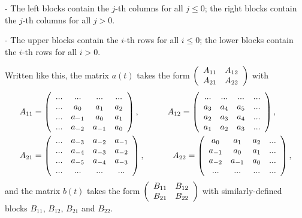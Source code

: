 \documentclass[etingof-lie.tex]{subfiles}
\begin{document}
- The left blocks contain the $j$-th columns for all $j\leq0$; the right
blocks contain the $j$-th columns for all $j>0$.

- The upper blocks contain the $i$-th rows for all $i\leq0$; the lower blocks
contain the $i$-th rows for all $i>0$.

Written like this, the matrix $a\left(  t\right)  $ takes the form $\left(
\begin{array}
[c]{cc}%
A_{11} & A_{12}\\
A_{21} & A_{22}%
\end{array}
\right)  $ with%
\begin{align*}
A_{11}  &  =\left(
\begin{array}
[c]{cccc}%
... & ... & ... & ...\\
... & a_{0} & a_{1} & a_{2}\\
... & a_{-1} & a_{0} & a_{1}\\
... & a_{-2} & a_{-1} & a_{0}%
\end{array}
\right)  ,\ \ \ \ \ \ \ \ \ \ A_{12}=\left(
\begin{array}
[c]{cccc}%
... & ... & ... & ...\\
a_{3} & a_{4} & a_{5} & ...\\
a_{2} & a_{3} & a_{4} & ...\\
a_{1} & a_{2} & a_{3} & ...
\end{array}
\right)  ,\\
A_{21}  &  =\left(
\begin{array}
[c]{cccc}%
... & a_{-3} & a_{-2} & a_{-1}\\
... & a_{-4} & a_{-3} & a_{-2}\\
... & a_{-5} & a_{-4} & a_{-3}\\
... & ... & ... & ...
\end{array}
\right)  ,\ \ \ \ \ \ \ \ \ \ A_{22}=\left(
\begin{array}
[c]{cccc}%
a_{0} & a_{1} & a_{2} & ...\\
a_{-1} & a_{0} & a_{1} & ...\\
a_{-2} & a_{-1} & a_{0} & ...\\
... & ... & ... & ...
\end{array}
\right)  ,
\end{align*}
and the matrix $b\left(  t\right)  $ takes the form $\left(
\begin{array}
[c]{cc}%
B_{11} & B_{12}\\
B_{21} & B_{22}%
\end{array}
\right)  $ with similarly-defined blocks $B_{11}$, $B_{12}$, $B_{21}$ and
$B_{22}$.
\end{document}
